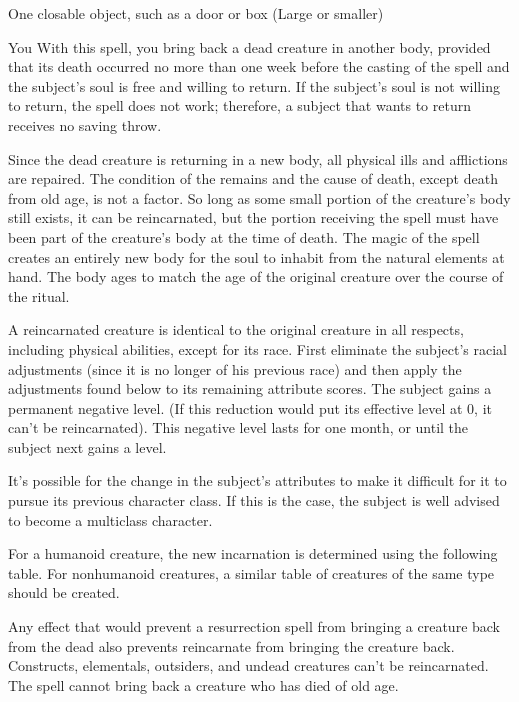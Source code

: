 \begin{spelltarget}{One closable object, such as a door or box (Large or smaller)}
\begin{spelltarget}{You}
\spelleffect With this spell, you bring back a dead creature in another body, provided that its death occurred no more than one week before the casting of the spell and the subject's soul is free and willing to return. If the subject's soul is not willing to return, the spell does not work; therefore, a subject that wants to return receives no saving throw.
\par Since the dead creature is returning in a new body, all physical ills and afflictions are repaired. The condition of the remains and the cause of death, except death from old age, is not a factor. So long as some small portion of the creature's body still exists, it can be reincarnated, but the portion receiving the spell must have been part of the creature's body at the time of death. The magic of the spell creates an entirely new body for the soul to inhabit from the natural elements at hand. The body ages to match the age of the original creature over the course of the ritual.
\par A reincarnated creature is identical to the original creature in all respects, including physical abilities, except for its race. First eliminate the subject's racial adjustments (since it is no longer of his previous race) and then apply the adjustments found below to its remaining attribute scores. The subject gains a permanent negative level. (If this reduction would put its effective level at 0, it can't be reincarnated). This negative level lasts for one month, or until the subject next gains a level.
\par It's possible for the change in the subject's attributes to make it difficult for it to pursue its previous character class. If this is the case, the subject is well advised to become a multiclass character.
\par For a humanoid creature, the new incarnation is determined using the following table. For nonhumanoid creatures, a similar table of creatures of the same type should be created.
\par Any effect that would prevent a resurrection spell from bringing a creature back from the dead also prevents reincarnate from bringing the creature back. Constructs, elementals, outsiders, and undead creatures can't be reincarnated. The spell cannot bring back a creature who has died of old age.
\begin{dtable}

\end{dtable}
\end{spelltarget}
\end{spelltarget}

